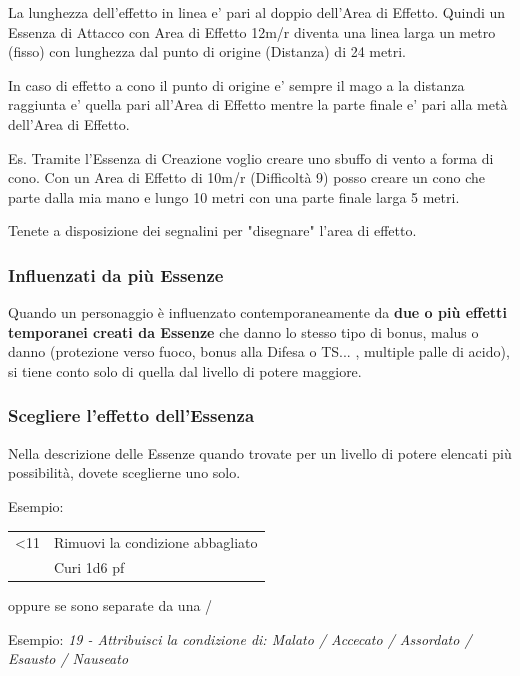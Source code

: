 \documentclass[a4paper,10 pt,twoside,openany]{book}
\begin{document}
La lunghezza dell'effetto in linea e' pari al doppio dell'Area di Effetto. Quindi un Essenza di Attacco con Area di Effetto 12m/r diventa una linea larga un metro (fisso) con lunghezza dal punto di origine (Distanza) di 24 metri.

In caso di effetto a cono il punto di origine e' sempre il mago a la distanza raggiunta e' quella pari all'Area di Effetto mentre la parte finale e' pari alla metà dell'Area di Effetto.

Es. Tramite l'Essenza di Creazione voglio creare uno sbuffo di vento a forma di cono.
Con un Area di Effetto di 10m/r (Difficoltà 9) posso creare un cono che parte dalla mia mano e lungo 10 metri con una parte finale larga 5 metri.

Tenete a disposizione dei segnalini per "disegnare" l'area di effetto.

\subsubsection{Influenzati da più Essenze}

\label{influenzati-da-piu-essenze}

Quando un personaggio è influenzato contemporaneamente da \textbf{due o più effetti temporanei creati da Essenze} che danno lo stesso tipo di bonus, malus o danno (protezione verso fuoco, bonus alla Difesa o TS... , multiple palle di acido), si tiene conto solo di quella dal livello di potere maggiore.

\subsubsection{Scegliere l'effetto dell'Essenza}

\label{scegliere-leffetto-dellessenza}

Nella descrizione delle Essenze quando trovate per un livello di potere elencati più possibilità, dovete sceglierne uno solo.

Esempio:

\medskip

\begin{tabularx}{0.95\textwidth}{lX}
	\toprule
	<11 & Rimuovi la condizione abbagliato\\
	& Curi 1d6 pf
\end{tabularx}

oppure se sono separate da una {/}

Esempio: \textit{19 - Attribuisci la condizione di: Malato / Accecato / Assordato / Esausto / Nauseato}
\end{document}

